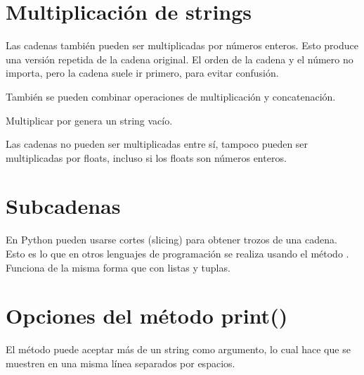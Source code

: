 \section{Multiplicación de strings}

Las cadenas también pueden ser multiplicadas por números enteros.
Esto produce una versión repetida de la cadena original.
El orden de la cadena y el número no importa, pero la cadena suele ir primero, para evitar confusión.


También se pueden combinar operaciones de multiplicación y concatenación.


Multiplicar por  genera un string vacío.


Las cadenas no pueden ser multiplicadas entre sí, tampoco pueden ser multiplicadas por floats, incluso si los floats son números enteros.





\section{Subcadenas}

En Python pueden usarse cortes (slicing) para obtener trozos de una cadena.
Esto es lo que en otros lenguajes de programación se realiza usando el método .
Funciona de la misma forma que con listas y tuplas.



\section{Opciones del método print()}

El método  puede aceptar más de un string como argumento, lo cual hace que se muestren en una misma línea separados por espacios.

